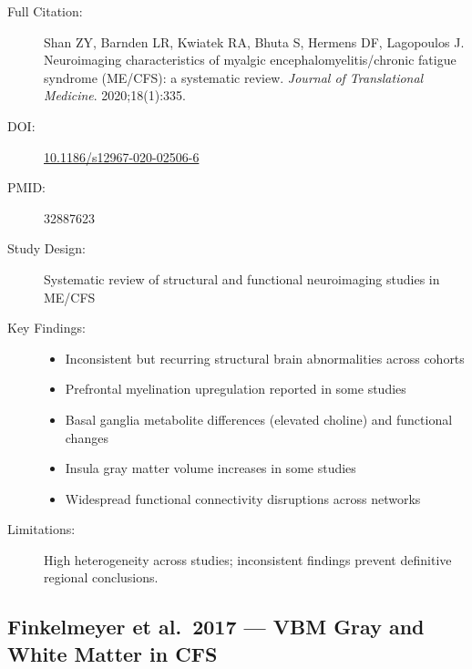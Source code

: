 \begin{description}
    \item[Full Citation:] Shan ZY, Barnden LR, Kwiatek RA, Bhuta S, Hermens DF, Lagopoulos J\@. Neuroimaging characteristics of myalgic encephalomyelitis/chronic fatigue syndrome (ME/CFS): a systematic review. \textit{Journal of Translational Medicine}. 2020;18(1):335.
    \item[DOI:] \href{https://doi.org/10.1186/s12967-020-02506-6}{10.1186/s12967-020-02506-6}
    \item[PMID:] 32887623
    \item[Study Design:] Systematic review of structural and functional neuroimaging studies in ME/CFS
    \item[Key Findings:]
    \begin{itemize}
        \item Inconsistent but recurring structural brain abnormalities across cohorts
        \item Prefrontal myelination upregulation reported in some studies
        \item Basal ganglia metabolite differences (elevated choline) and functional changes
        \item Insula gray matter volume increases in some studies
        \item Widespread functional connectivity disruptions across networks
    \end{itemize}
    \item[Limitations:] High heterogeneity across studies; inconsistent findings prevent definitive regional conclusions.
\end{description}

\subsection{Finkelmeyer et al.\ 2017 --- VBM Gray and White Matter in CFS}

